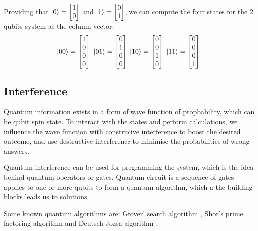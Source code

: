 Providing that $\left\vert{0}\right\rangle = \begin{bmatrix}1 \\ 0\end{bmatrix}$ and $\left\vert{1}\right\rangle = \begin{bmatrix}0 \\ 1\end{bmatrix}$, we can compute the four states for the 2 qubits system as the column vector:
\begin{equation}
    \left\vert{00}\right\rangle = \begin{bmatrix}1 \\ 0 \\ 0 \\ 0 \end{bmatrix} \;
    \left\vert{01}\right\rangle = \begin{bmatrix}0 \\ 1 \\ 0 \\ 0 \end{bmatrix} \;
    \left\vert{10}\right\rangle = \begin{bmatrix}0 \\ 0 \\ 1 \\ 0 \end{bmatrix} \;
    \left\vert{11}\right\rangle = \begin{bmatrix}0 \\ 0 \\ 0 \\ 1 \end{bmatrix} \;
\end{equation}

\subsection{Interference} \label{Sec: Interference}

Quantum information exists in a form of wave function of propbability, which can be qubit spin state.
To interact with the states and perform calculations, we influence the wave function with construcive interference to boost the desired outcome, and use destructive interference to minimise the probabilities of wrong answers.

Quantum interference can be used for programming the system, which is the idea behind quantum operators or gates.
Quantum circuit is a sequence of gates applies to one or more qubits to form a quantum algorithm, which a the building blocks leads us to solutions.

Some known quantum algorithms are: Grover' search algorithm \cite{groverFastQuantumMechanical1996}, Shor's prime factoring algorithm \cite{shorAlgorithmsQuantumComputation1994} and Deutsch-Jozsa algorithm \cite{deutschRapidSolutionProblems1992}.

